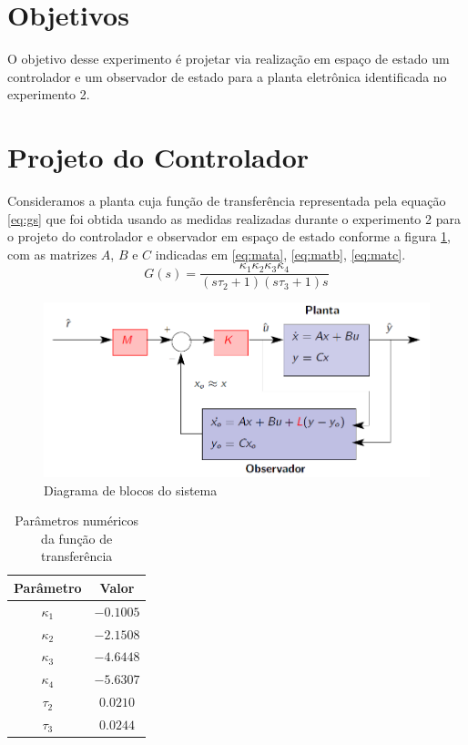 \documentclass{article}
\begin{document}


\onehalfspacing
\section{Objetivos} 
O objetivo desse experimento é projetar via realização em espaço de estado um controlador e um observador de estado para a planta eletrônica identificada no experimento 2\cite{bb:lab2}. 
	
\section{Projeto do Controlador}
Consideramos a planta cuja função de transferência representada pela equação \ref{eq:gs} que foi obtida usando as medidas realizadas durante o experimento 2\cite{bb:lab2} para o projeto do controlador e observador em espaço de estado conforme a figura \ref{fig:contrss}, com as matrizes $A$, $B$ e $C$ indicadas em \ref{eq:mata}, \ref{eq:matb}, \ref{eq:matc}.\\

\begin{equation}
\label{eq:gs}
G(s) = \frac{\kappa_1\kappa_2\kappa_3\kappa_4}{(s\tau_2 + 1)(s\tau_3 + 1)s}
\end{equation}

\begin{figure}[H]
	\centering
	\includegraphics[width=0.8\linewidth]{contrss}
	\caption{Diagrama de blocos do sistema}
	\label{fig:contrss}
\end{figure}

\begin{table}[H]
	\centering
	\caption{Parâmetros numéricos da função de transferência}
	\label{tab:valores}
	\begin{tabular}{|c|c|}
		\hline Parâmetro & Valor \\ 
		\hline $\kappa_1$ & $-0.1005$\\ 
		\hline $\kappa_2$ & $-2.1508$\\ 
		\hline $\kappa_3$ & $-4.6448$\\ 
		\hline $\kappa_4$ & $-5.6307$\\ 
		\hline $\tau_2$ & $0.0210$\\ 
		\hline $\tau_3$ & $0.0244$ \\ 	
		\hline 
	\end{tabular} 
\end{table}
\end{document}
